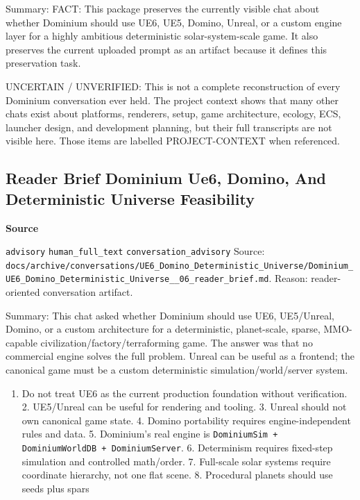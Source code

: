 \documentclass[9pt,a4paper,openany]{book}
\newcommand{\vonecallout}[3]{\par\medskip\noindent\begingroup\setlength{\fboxsep}{7pt}\colorbox{DomCalloutBg}{\parbox{0.94\linewidth}{\textbf{\textcolor{#1}{#2}}\par #3}}\endgroup\par\medskip}
\begin{document}
Summary: FACT: This package preserves the currently visible chat about whether Dominium should use UE6, UE5, Domino, Unreal, or a custom engine layer for a highly ambitious deterministic solar-\allowbreak{}system-\allowbreak{}scale game.\allowbreak{} It also preserves the current uploaded prompt as an artifact because it defines this preservation task.\allowbreak{}


UNCERTAIN /\allowbreak{} UNVERIFIED: This is not a complete reconstruction of every Dominium conversation ever held.\allowbreak{} The project context shows that many other chats exist about platforms, renderers, setup, game architecture, ecology, ECS, launcher design, and development planning, but their full transcripts are not visible here.\allowbreak{} Those items are labelled PROJECT-\allowbreak{}CONTEXT when referenced.\allowbreak{}



\subsection{Reader Brief Dominium Ue6, Domino, And Deterministic Universe Feasibility}

\vonecallout{DomSlate}{Source}{\texttt{advisory} \texttt{human\_\allowbreak{}full\_\allowbreak{}text} \texttt{conversation\_\allowbreak{}advisory} Source: \texttt{docs/\allowbreak{}archive/\allowbreak{}conversations/\allowbreak{}UE6\_\allowbreak{}Domino\_\allowbreak{}Deterministic\_\allowbreak{}Universe/\allowbreak{}Dominium\_\allowbreak{}UE6\_\allowbreak{}Domino\_\allowbreak{}Deterministic\_\allowbreak{}Universe\_\allowbreak{}\_\allowbreak{}06\_\allowbreak{}reader\_\allowbreak{}brief.\allowbreak{}md}.\allowbreak{} Reason: reader-\allowbreak{}oriented conversation artifact.\allowbreak{}}

Summary: This chat asked whether Dominium should use UE6, UE5/\allowbreak{}Unreal, Domino, or a custom architecture for a deterministic, planet-\allowbreak{}scale, sparse, MMO-\allowbreak{}capable civilization/\allowbreak{}factory/\allowbreak{}terraforming game.\allowbreak{} The answer was that no commercial engine solves the full problem.\allowbreak{} Unreal can be useful as a frontend; the canonical game must be a custom deterministic simulation/\allowbreak{}world/\allowbreak{}server system.\allowbreak{}


\begin{enumerate}
\item Do not treat UE6 as the current production foundation without verification.\allowbreak{} 2.\allowbreak{} UE5/\allowbreak{}Unreal can be useful for rendering and tooling.\allowbreak{} 3.\allowbreak{} Unreal should not own canonical game state.\allowbreak{} 4.\allowbreak{} Domino portability requires engine-\allowbreak{}independent rules and data.\allowbreak{} 5.\allowbreak{} Dominium's real engine is \texttt{DominiumSim + DominiumWorldDB + DominiumServer}.\allowbreak{} 6.\allowbreak{} Determinism requires fixed-\allowbreak{}step simulation and controlled math/\allowbreak{}order.\allowbreak{} 7.\allowbreak{} Full-\allowbreak{}scale solar systems require coordinate hierarchy, not one flat scene.\allowbreak{} 8.\allowbreak{} Procedural planets should use seeds plus spars
\end{enumerate}
\end{document}
